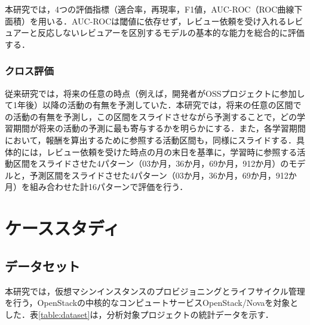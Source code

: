 \documentclass[submit,techrep,noauthor]{ipsj}
\begin{document}
本研究では，4つの評価指標（適合率，再現率，F1値，AUC-ROC（ROC曲線下面積）を用いる．AUC-ROCは閾値に依存せず，レビュー依頼を受け入れるレビュアーと反応しないレビュアーを区別するモデルの基本的な能力を総合的に評価する．

\subsubsection{クロス評価}


従来研究では，将来の任意の時点（例えば，開発者がOSSプロジェクトに参加して1年後）以降の活動の有無を予測していた．本研究では，将来の任意の区間での活動の有無を予測し，この区間をスライドさせながら予測することで，どの学習期間が将来の活動の予測に最も寄与するかを明らかにする．また，各学習期間において，報酬を算出するために参照する活動区間も，同様にスライドする．具体的には，レビュー依頼を受けた時点の月の末日を基準に，学習時に参照する活動区間をスライドさせた4パターン（03か月，36か月，69か月，912か月）のモデルと，予測区間をスライドさせた4パターン（03か月，36か月，69か月，912か月）を組み合わせた計16パターンで評価を行う．

\section{ケーススタディ}
\label{sec:casestudy}

\subsection{データセット}
本研究では，仮想マシンインスタンスのプロビジョニングとライフサイクル管理を行う，OpenStackの中核的なコンピュートサービスOpenStack/Novaを対象とした．表\ref{table:dataset}は，分析対象プロジェクトの統計データを示す．
\end{document}
